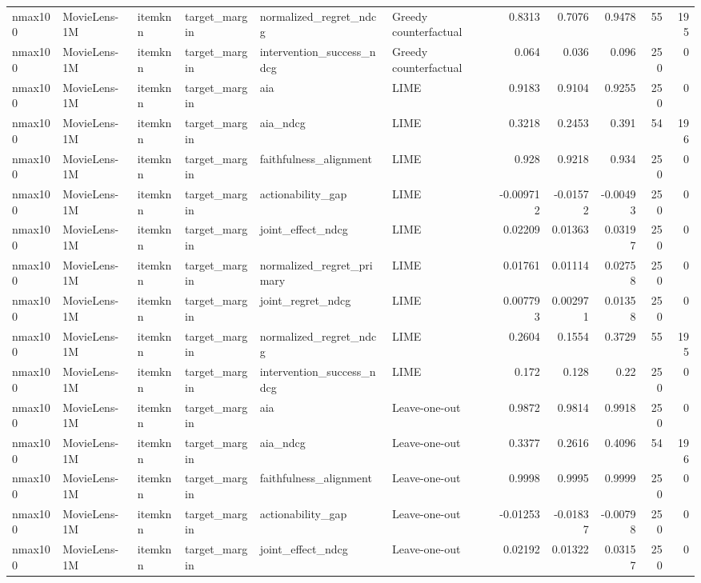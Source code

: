 \begin{table}[t]
{\begin{tabular}{llllllrrrrr}
nmax100 & MovieLens-1M & itemknn & target\_margin & normalized\_regret\_ndcg & Greedy counterfactual & 0.8313 & 0.7076 & 0.9478 & 55 & 195 \\
nmax100 & MovieLens-1M & itemknn & target\_margin & intervention\_success\_ndcg & Greedy counterfactual & 0.064 & 0.036 & 0.096 & 250 & 0 \\
nmax100 & MovieLens-1M & itemknn & target\_margin & aia & LIME & 0.9183 & 0.9104 & 0.9255 & 250 & 0 \\
nmax100 & MovieLens-1M & itemknn & target\_margin & aia\_ndcg & LIME & 0.3218 & 0.2453 & 0.391 & 54 & 196 \\
nmax100 & MovieLens-1M & itemknn & target\_margin & faithfulness\_alignment & LIME & 0.928 & 0.9218 & 0.934 & 250 & 0 \\
nmax100 & MovieLens-1M & itemknn & target\_margin & actionability\_gap & LIME & -0.009712 & -0.01572 & -0.00493 & 250 & 0 \\
nmax100 & MovieLens-1M & itemknn & target\_margin & joint\_effect\_ndcg & LIME & 0.02209 & 0.01363 & 0.03197 & 250 & 0 \\
nmax100 & MovieLens-1M & itemknn & target\_margin & normalized\_regret\_primary & LIME & 0.01761 & 0.01114 & 0.02758 & 250 & 0 \\
nmax100 & MovieLens-1M & itemknn & target\_margin & joint\_regret\_ndcg & LIME & 0.007793 & 0.002971 & 0.01358 & 250 & 0 \\
nmax100 & MovieLens-1M & itemknn & target\_margin & normalized\_regret\_ndcg & LIME & 0.2604 & 0.1554 & 0.3729 & 55 & 195 \\
nmax100 & MovieLens-1M & itemknn & target\_margin & intervention\_success\_ndcg & LIME & 0.172 & 0.128 & 0.22 & 250 & 0 \\
nmax100 & MovieLens-1M & itemknn & target\_margin & aia & Leave-one-out & 0.9872 & 0.9814 & 0.9918 & 250 & 0 \\
nmax100 & MovieLens-1M & itemknn & target\_margin & aia\_ndcg & Leave-one-out & 0.3377 & 0.2616 & 0.4096 & 54 & 196 \\
nmax100 & MovieLens-1M & itemknn & target\_margin & faithfulness\_alignment & Leave-one-out & 0.9998 & 0.9995 & 0.9999 & 250 & 0 \\
nmax100 & MovieLens-1M & itemknn & target\_margin & actionability\_gap & Leave-one-out & -0.01253 & -0.01837 & -0.00798 & 250 & 0 \\
nmax100 & MovieLens-1M & itemknn & target\_margin & joint\_effect\_ndcg & Leave-one-out & 0.02192 & 0.01322 & 0.03157 & 250 & 0 \\

\end{tabular}}
\end{table}
